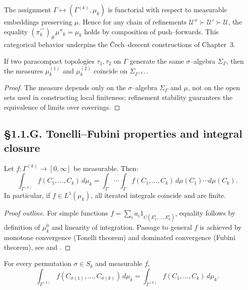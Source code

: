 \begin{remark}[Functoriality of $\mu_k$]
The assignment $\Gamma\mapsto(\Gamma^{(k)},\mu_k)$ is functorial with respect to measurable embeddings preserving $\mu$. 
Hence for any chain of refinements $\mathcal U''\succ\mathcal U'\succ\mathcal U$, the equality 
\((\pi_k^{\prime\prime\prime})_\#\mu''_k=\mu_k\)
holds by composition of push–forwards. 
This categorical behavior underpins the Čech–descent constructions of Chapter~3.
\end{remark}

\begin{corollary}\label{cor:1.1.ind}
If two paracompact topologies $\tau_1,\tau_2$ on $\Gamma$ generate the same $\sigma$–algebra $\Sigma_\Gamma$, then the measures $\mu_k^{(1)}$ and $\mu_k^{(2)}$ coincide on $\Sigma_{\Gamma^{(k)}}$.
\end{corollary}

\begin{proof}
The measure depends only on the $\sigma$–algebra $\Sigma_\Gamma$ and $\mu$, not on the open sets used in constructing local finiteness; refinement stability guarantees the equivalence of limits over coverings.
\end{proof}

\subsection*{§1.1.G. Tonelli–Fubini properties and integral closure}

\begin{lemma}\label{lem:1.1.fubini}
Let $f:\Gamma^{(k)}\to[0,\infty]$ be measurable. Then:
\[
\int_{\Gamma^{(k)}} f(C_1,\ldots,C_k)\,d\mu_k
 =\int_\Gamma\cdots\int_\Gamma
 f(C_1,\ldots,C_k)\,d\mu(C_1)\cdots d\mu(C_k).
\]
In particular, if $f\in L^1(\mu_k)$, all iterated integrals coincide and are finite.
\end{lemma}

\begin{proof}[Proof outline]
For simple functions $f=\sum_i a_i 1_{C(E^i_1,\ldots,E^i_k)}$, equality follows by definition of $\mu_k^0$ and linearity of integration. 
Passage to general $f$ is achieved by monotone convergence (Tonelli theorem) and dominated convergence (Fubini theorem), see \cite[Ch.\,3]{Halmos} and \cite[§5.2]{Bogachev1}.
\end{proof}

\begin{lemma}\label{lem:1.1.sym}
For every permutation $\sigma\in S_k$ and measurable $f$,
\[
\int_{\Gamma^{(k)}} f(C_{\sigma(1)},\ldots,C_{\sigma(k)})\,d\mu_k
 =\int_{\Gamma^{(k)}} f(C_1,\ldots,C_k)\,d\mu_k.
\]
\end{lemma}

